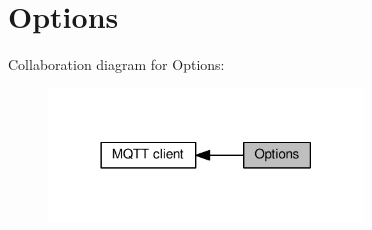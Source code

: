 \hypertarget{group__mqtt__opts}{}\section{Options}
\label{group__mqtt__opts}
Collaboration diagram for Options\+:
\nopagebreak
\begin{figure}[H]
\begin{center}
\leavevmode
\includegraphics[width=237pt]{group__mqtt__opts}
\end{center}
\end{figure}
